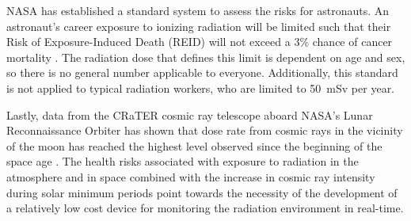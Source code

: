 NASA has established a standard system to assess the risks for astronauts.
An astronaut's career exposure to ionizing radiation will be limited such that their Risk of Exposure-Induced Death (REID) will not exceed a 3\% chance of cancer mortality \cite{nasa-reid}. The radiation dose that defines this limit is dependent on age and sex, so there is no general number applicable to everyone. Additionally, this standard is not applied to typical radiation workers, who are limited to \SI{50}{\milli\sievert} per year.

Lastly, data from the CRaTER cosmic ray telescope aboard NASA’s Lunar Reconnaissance Orbiter has shown that dose rate from cosmic rays in the vicinity of the moon has reached the highest level observed since the beginning of the space age \cite{crater}. The health risks associated with exposure to radiation in the atmosphere and in space combined with the increase in cosmic ray intensity during solar minimum periods point towards the necessity of the development of a relatively low cost device for monitoring the radiation environment in real-time.

